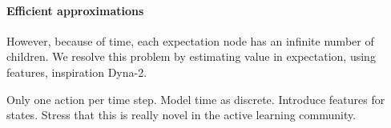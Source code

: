 \paragraph{Efficient approximations}

However, because of time, each expectation node has an infinite number of children.
We resolve this problem by estimating value in expectation, using features, inspiration Dyna-2. 

Only one action per time step.
Model time as discrete. Introduce features for states.
Stress that this is really novel in the active learning community.


